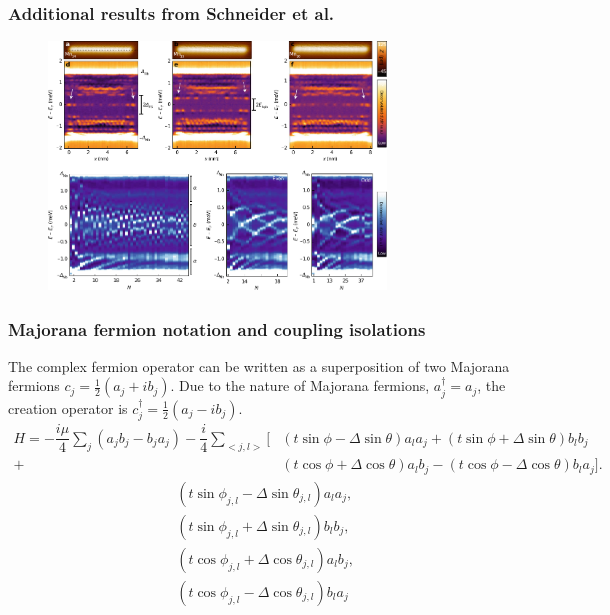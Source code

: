 \documentclass[xcolor=dvipsnames,10pt,aspectratio=169]{beamer}
\newcommand{\cc}{c^{\dagger}}
\newcommand{\de}{\Delta}
\begin{document}
  \appendix

  \begin{frame}
    \frametitle{Additional results from Schneider et al.}

    \begin{figure}
      \includegraphics[width=0.8\textwidth]{./figures/Schneider-additional-results.pdf}
    \end{figure}

  \end{frame}

  \begin{frame}
  \frametitle{Majorana fermion notation and coupling isolations}
    The complex fermion operator can be written as a superposition of two Majorana fermions $c_j = \frac{1}{2} (a_j + i b_j)$.
    Due to the nature of Majorana fermions, $a^{\dagger}_j = a_j$, the creation operator is $\cc_j = \frac{1}{2} (a_j - i b_j)$.
    \begin{align*}
      H = -\dfrac{i\mu}{4} \sum_j (a_j b_j - b_j a_j) - \dfrac{i}{4} \sum_{<j,l>} [&(t\sin\phi-\de\sin\theta) a_l a_j + (t\sin\phi+\de\sin\theta) b_l b_j \nonumber \\
      +&(t\cos\phi+\de\cos\theta) a_l b_j - (t\cos\phi-\de\cos\theta) b_l a_j].
    \end{align*}
    \begin{align}
      &(t \sin\phi_{j,l} - \de \sin\theta_{j,l}) a_l a_j, \\
      &(t \sin\phi_{j,l} + \de \sin\theta_{j,l}) b_l b_j, \\
      &(t \cos\phi_{j,l} + \de \cos\theta_{j,l}) a_l b_j, \\
      &(t \cos\phi_{j,l} - \de \cos\theta_{j,l}) b_l a_j
    \end{align}
  \end{frame}
\end{document}
